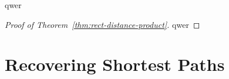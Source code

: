 \begin{theorem}\label{thm:rect-distance-product}
    qwer
\end{theorem}

\begin{proof}[Proof of Theorem~\ref{thm:rect-distance-product}]
    qwer
\end{proof}



\section{Recovering Shortest Paths}\label{sec:recovery}


